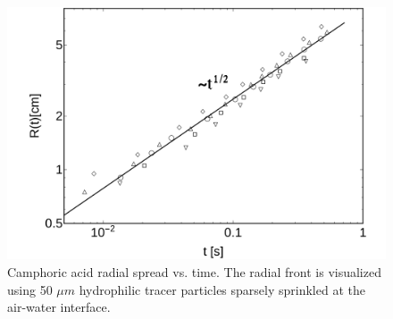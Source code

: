 \documentclass[aps, twocolumn, floatfix, superscriptaddress]{revtex4}
\begin{document}
\begin{figure}[ht]
    \begin{center}
       \includegraphics[scale=0.35]{figure4.pdf}
    \end{center}
    \caption{Camphoric acid radial spread vs. time. The radial front is visualized using 50 $\mu m$ hydrophilic tracer particles sparsely sprinkled at the air-water interface. }
    \label{fig:caspread}
\end{figure}
\end{document}
